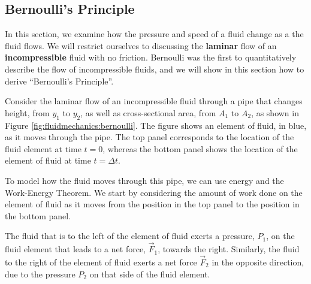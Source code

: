 {{\subsection{Bernoulli's Principle}
In this section, we examine how the pressure and speed of a fluid change as a the fluid flows. We will restrict ourselves to discussing the \textbf{laminar} flow of an \textbf{incompressible} fluid with no friction. Bernoulli was the first to quantitatively describe the flow of incompressible fluids, and we will show in this section how to derive ``Bernoulli's Principle''. 

Consider the laminar flow of an incompressible fluid through a pipe that changes height, from $y_1$ to $y_2$, as well as cross-sectional area, from $A_1$ to $A_2$, as shown in Figure \ref{fig:fluidmechanics:bernoulli}. The figure shows an element of fluid, in blue, as it moves through the pipe. The top panel corresponds to the location of the fluid element at time $t=0$, whereas the bottom panel shows the location of the element of fluid at time $t=\Delta t$.

To model how the fluid moves through this pipe, we can use energy and the Work-Energy Theorem. We start by considering the amount of work done on the element of fluid as it moves from the position in the top panel to the position in the bottom panel. 

The fluid that is to the left of the element of fluid exerts a pressure, $P_1$, on the fluid element that leads to a net force, $\vec F_1$, towards the right. Similarly, the fluid to the right of the element of fluid exerts a net force $\vec F_2$ in the opposite direction, due to the pressure $P_2$ on that side of the fluid element.

}}
